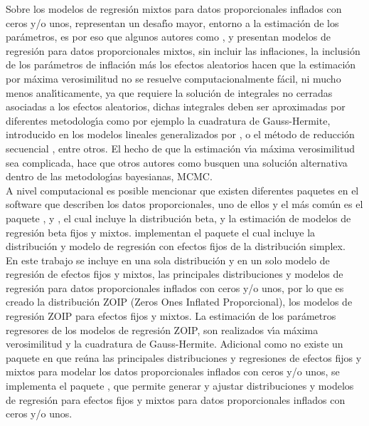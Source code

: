 Sobre los modelos de regresi\'{o}n mixtos para datos proporcionales inflados con ceros y/o unos, representan un desaf\'{\i}o mayor, entorno a la estimaci\'{o}n de los par\'{a}metros, es por eso que algunos autores como \cite{Usuga1}, \cite{Bonat2} \cite{Song1} y \cite{Stasinopoulos2} presentan modelos de regresi\'{o}n para datos proporcionales mixtos, sin incluir las inflaciones, la inclusi\'{o}n de los par\'{a}metros de inflaci\'{o}n m\'{a}s los efectos aleatorios hacen que la estimaci\'{o}n por m\'{a}xima verosimilitud no se resuelve computacionalmente f\'{a}cil, ni mucho menos anal\'{\i}ticamente, ya que requiere la soluci\'{o}n de integrales no cerradas asociadas a los efectos aleatorios, dichas integrales deben ser aproximadas por diferentes metodolog\'{\i}a como por ejemplo la cuadratura de Gauss-Hermite, introducido en los modelos lineales generalizados por \cite{Fahrmeir1}, o el m\'{e}todo de reducci\'{o}n secuencial \citep{Ogden1}, entre otros. El hecho de que la estimaci\'{o}n v\'{\i}a m\'{a}xima verosimilitud sea complicada, hace que otros autores como \cite{Galvis1} busquen una soluci\'{o}n alternativa dentro de las metodolog\'{\i}as bayesianas, MCMC.\\

A nivel computacional es posible mencionar que existen diferentes paquetes en el software  que describen los datos proporcionales, uno de ellos y el m\'{a}s com\'{u}n es el paquete  \citep{Zeileis1}, \citep{Ferrari1} y \citep{Simas1}, el cual incluye la distribuci\'{o}n beta, y la estimaci\'{o}n de modelos de regresi\'{o}n beta fijos y mixtos. \cite{Qiu1} implementan el paquete  el cual incluye la distribuci\'{o}n y modelo de regresi\'{o}n con efectos fijos de la distribuci\'{o}n simplex.\\

En este trabajo se incluye en una sola distribuci\'{o}n y en un solo modelo de regresi\'{o}n de efectos fijos y mixtos, las principales distribuciones y modelos de regresi\'{o}n para datos proporcionales inflados con ceros y/o unos, por lo que es creado la distribuci\'{o}n ZOIP (Zeros Ones Inflated Proporcional), los modelos de regresi\'{o}n ZOIP para efectos fijos y mixtos. La estimaci\'{o}n de los par\'{a}metros regresores de los modelos de regresi\'{o}n ZOIP, son realizados v\'{\i}a m\'{a}xima verosimilitud y la cuadratura de Gauss-Hermite. Adicional como no existe un paquete en  que re\'{u}na las principales distribuciones y regresiones de efectos fijos y mixtos para modelar los datos proporcionales inflados con ceros y/o unos, se implementa el paquete , que permite generar y ajustar distribuciones y modelos de regresi\'{o}n para efectos fijos y mixtos para datos proporcionales inflados con ceros y/o unos.

